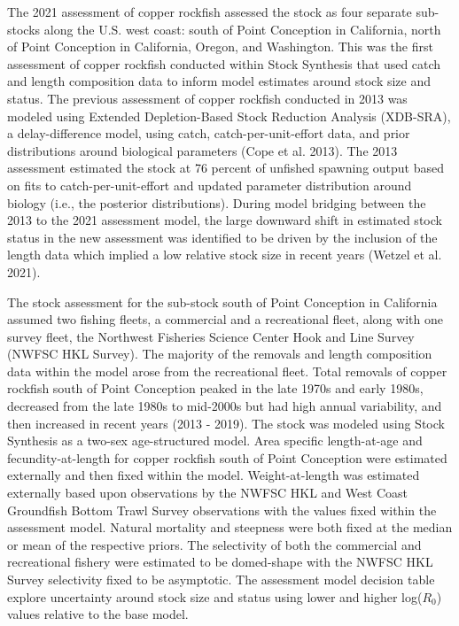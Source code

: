 \documentclass[11pt,
  english,
  a4paper,
]{article}
\begin{document}
The 2021 assessment of copper rockfish assessed the stock as four separate sub-stocks along the U.S. west coast: south of Point Conception in California, north of Point Conception in California, Oregon, and Washington. This was the first assessment of copper rockfish conducted within Stock Synthesis that used catch and length composition data to inform model estimates around stock size and status. The previous assessment of copper rockfish conducted in 2013 was modeled using Extended Depletion-Based Stock Reduction Analysis (XDB-SRA), a delay-difference model, using catch, catch-per-unit-effort data, and prior distributions around biological parameters {(Cope et al. 2013)\leavevmode\tagmcend\tagstructend}. The 2013 assessment estimated the stock at 76 percent of unfished spawning output based on fits to catch-per-unit-effort and updated parameter distribution around biology (i.e., the posterior distributions). During model bridging between the 2013 to the 2021 assessment model, the large downward shift in estimated stock status in the new assessment was identified to be driven by the inclusion of the length data which implied a low relative stock size in recent years {(Wetzel et al. 2021)\leavevmode\tagmcend\tagstructend}.

\leavevmode\tagmcend\tagstructend\par


The stock assessment for the sub-stock south of Point Conception in California assumed two fishing fleets, a commercial and a recreational fleet, along with one survey fleet, the Northwest Fisheries Science Center Hook and Line Survey (NWFSC HKL Survey). The majority of the removals and length composition data within the model arose from the recreational fleet. Total removals of copper rockfish south of Point Conception peaked in the late 1970s and early 1980s, decreased from the late 1980s to mid-2000s but had high annual variability, and then increased in recent years (2013 - 2019). The stock was modeled using Stock Synthesis as a two-sex age-structured model. Area specific length-at-age and fecundity-at-length for copper rockfish south of Point Conception were estimated externally and then fixed within the model. Weight-at-length was estimated externally based upon observations by the NWFSC HKL and West Coast Groundfish Bottom Trawl Survey observations with the values fixed within the assessment model. Natural mortality and steepness were both fixed at the median or mean of the respective priors. The selectivity of both the commercial and recreational fishery were estimated to be domed-shape with the NWFSC HKL Survey selectivity fixed to be asymptotic. The assessment model decision table explore uncertainty around stock size and status using lower and higher log({\(R_0\)\leavevmode\tagmcend\tagstructend}) values relative to the base model.
\end{document}
